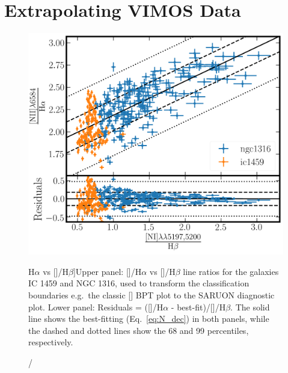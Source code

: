 \documentclass[a4paper,fleqn,usenatbib]{mnras}
\newcommand{\bracket}[1]{[#1]} %
\begin{document}






\appendix
\section{Extrapolating VIMOS Data}
	\label{sec:Decrement}
	\begin{figure}
		\includegraphics[width=\columnwidth]{ratio_fit.png}
		\caption[\bracket{}/H$\alpha$ vs \bracket{}/H$\beta$]{Upper panel: []/H$\alpha$ vs []/H$\beta$ line ratios for the galaxies IC 1459 and NGC 1316, used to transform the classification boundaries e.g.\ the classic [] BPT plot to the SARUON diagnostic plot. Lower panel: Residuals = ([]/H$\alpha$ - best-fit)/[]/H$\beta$. The solid line shows the best-fitting (Eq.\ \ref{eq:N_dec}) in both panels, while the dashed and dotted lines show the 68 and 99 percentiles, respectively.}
		\label{fig:ratio_relation}
	\end{figure}
\end{document}
